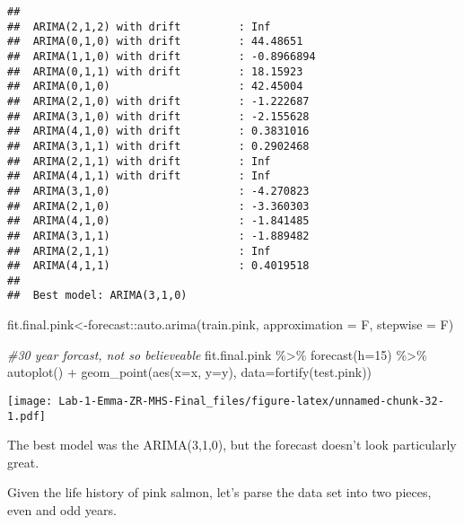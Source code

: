 \documentclass[
]{article}
\newenvironment{Shaded}{\begin{snugshade}}{\end{snugshade}}
\newcommand{\AttributeTok}[1]{\textcolor[rgb]{0.77,0.63,0.00}{#1}}
\newcommand{\CommentTok}[1]{\textcolor[rgb]{0.56,0.35,0.01}{\textit{#1}}}
\newcommand{\DecValTok}[1]{\textcolor[rgb]{0.00,0.00,0.81}{#1}}
\newcommand{\FunctionTok}[1]{\textcolor[rgb]{0.00,0.00,0.00}{#1}}
\newcommand{\NormalTok}[1]{#1}
\newcommand{\OtherTok}[1]{\textcolor[rgb]{0.56,0.35,0.01}{#1}}
\newcommand{\SpecialCharTok}[1]{\textcolor[rgb]{0.00,0.00,0.00}{#1}}
\begin{document}
\begin{verbatim}
## 
##  ARIMA(2,1,2) with drift         : Inf
##  ARIMA(0,1,0) with drift         : 44.48651
##  ARIMA(1,1,0) with drift         : -0.8966894
##  ARIMA(0,1,1) with drift         : 18.15923
##  ARIMA(0,1,0)                    : 42.45004
##  ARIMA(2,1,0) with drift         : -1.222687
##  ARIMA(3,1,0) with drift         : -2.155628
##  ARIMA(4,1,0) with drift         : 0.3831016
##  ARIMA(3,1,1) with drift         : 0.2902468
##  ARIMA(2,1,1) with drift         : Inf
##  ARIMA(4,1,1) with drift         : Inf
##  ARIMA(3,1,0)                    : -4.270823
##  ARIMA(2,1,0)                    : -3.360303
##  ARIMA(4,1,0)                    : -1.841485
##  ARIMA(3,1,1)                    : -1.889482
##  ARIMA(2,1,1)                    : Inf
##  ARIMA(4,1,1)                    : 0.4019518
## 
##  Best model: ARIMA(3,1,0)
\end{verbatim}

\begin{Shaded}
\begin{Highlighting}[]
\NormalTok{fit.final.pink}\OtherTok{\textless{}{-}}\NormalTok{forecast}\SpecialCharTok{::}\FunctionTok{auto.arima}\NormalTok{(train.pink, }\AttributeTok{approximation =}\NormalTok{ F, }\AttributeTok{stepwise =}\NormalTok{ F)}

\CommentTok{\#30 year forcast, not so believeable}
\NormalTok{fit.final.pink }\SpecialCharTok{\%\textgreater{}\%}
  \FunctionTok{forecast}\NormalTok{(}\AttributeTok{h=}\DecValTok{15}\NormalTok{) }\SpecialCharTok{\%\textgreater{}\%}
  \FunctionTok{autoplot}\NormalTok{() }\SpecialCharTok{+} \FunctionTok{geom\_point}\NormalTok{(}\FunctionTok{aes}\NormalTok{(}\AttributeTok{x=}\NormalTok{x, }\AttributeTok{y=}\NormalTok{y), }\AttributeTok{data=}\FunctionTok{fortify}\NormalTok{(test.pink))}
\end{Highlighting}
\end{Shaded}

\texttt{[image: Lab-1-Emma-ZR-MHS-Final\_files/figure-latex/unnamed-chunk-32-1.pdf]}

The best model was the ARIMA(3,1,0), but the forecast doesn't look
particularly great.

Given the life history of pink salmon, let's parse the data set into two
pieces, even and odd years.
\end{document}
